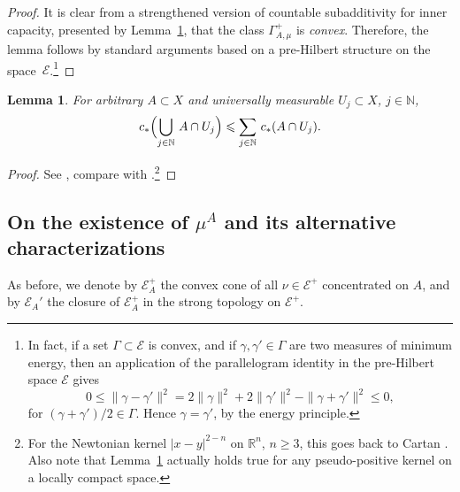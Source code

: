 \documentclass[12pt,a4paper,reqno]{amsart} %
\theoremstyle{lause}
\theoremstyle{maaritelma}
\theoremstyle{lause}
\newtheorem{lemma}[theorem]{Lemma}
\theoremstyle{maaritelma}
\numberwithin{equation}{section}
\begin{document}
\begin{proof} It is clear from a strengthened version of countable subadditivity for inner capacity,  presented by Lemma~\ref{str}, that the class $\Gamma_{A,\mu}^+$ is {\it convex}. Therefore, the lemma follows by standard arguments based on a pre-Hil\-bert structure on the space~$\mathcal E$.\footnote{In fact, if a set $\Gamma\subset\mathcal E$ is convex, and if $\gamma,\gamma'\in\Gamma$ are two measures of minimum energy, then an application of the parallelogram identity in the pre-Hilbert space $\mathcal E$ gives
\[0\leqslant\|\gamma-\gamma'\|^2=2\|\gamma\|^2+2\|\gamma'\|^2-\|\gamma+\gamma'\|^2\leqslant0,\]
for $(\gamma+\gamma')/2\in\Gamma$. Hence $\gamma=\gamma'$, by the energy principle.\label{unique}}\end{proof}

\begin{lemma}\label{str}
For arbitrary\/ $A\subset X$ and universally measurable\/ $U_j\subset X$, $j\in\mathbb N$,
\[c_*\Bigl(\bigcup_{j\in\mathbb N}\,A\cap U_j\Bigr)\leqslant\sum_{j\in\mathbb N}\,c_*(A\cap U_j).\]\end{lemma}

\begin{proof}See \cite[p.~158, Remark]{F1}, compare with \cite[Lemma~2.3.5]{F1}.\footnote{For the Newtonian kernel $|x-y|^{2-n}$ on $\mathbb R^n$, $n\geqslant3$, this goes back to Cartan \cite[p.~253]{Ca2}. Also note that Lemma~\ref{str} actually holds true for any pse\-udo-pos\-it\-ive kernel on a locally compact space.}\end{proof}

\subsection{On the existence of $\mu^A$ and its alternative characterizations}
As before, we denote by $\mathcal E^+_A$ the convex cone of all $\nu\in\mathcal E^+$ concentrated on $A$, and by $\mathcal E_A'$ the closure of $\mathcal E^+_A$ in the strong topology on $\mathcal E^+$.
\end{document}
